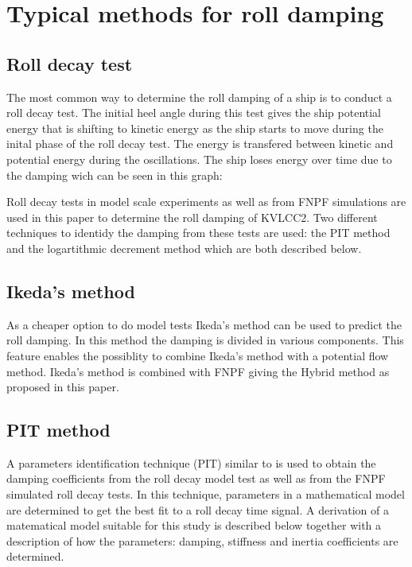 \section{Typical methods for roll
damping}\label{typical-methods-for-roll-damping}

    \subsection{Roll decay test}\label{roll-decay-test}

The most common way to determine the roll damping of a ship is to
conduct a roll decay test. The initial heel angle during this test gives
the ship potential energy that is shifting to kinetic energy as the ship
starts to move during the inital phase of the roll decay test. The
energy is transfered between kinetic and potential energy during the
oscillations. The ship loses energy over time due to the damping wich
can be seen in this graph:
 
            
    
    
    

    Roll decay tests in model scale experiments as well as from FNPF
simulations are used in this paper to determine the roll damping of
KVLCC2. Two different techniques to identidy the damping from these
tests are used: the PIT method and the logartithmic decrement method
which are both described below.

\subsection{Ikeda's method}\label{ikedas-method}

As a cheaper option to do model tests Ikeda's method can be used to
predict the roll damping. In this method the damping is divided in
various components. This feature enables the possiblity to combine
Ikeda's method with a potential flow method. Ikeda's method is combined
with FNPF giving the Hybrid method as proposed in this paper.

    \subsection{PIT method}\label{pit-method}

    A parameters identification technique (PIT) similar to
\cite{7505983/EXYJELCU} is used to obtain the damping coefficients from
the roll decay model test as well as from the FNPF simulated roll decay
tests. In this technique, parameters in a mathematical model are
determined to get the best fit to a roll decay time signal. A derivation
of a matematical model suitable for this study is described below
together with a description of how the parameters: damping, stiffness
and inertia coefficients are determined.

